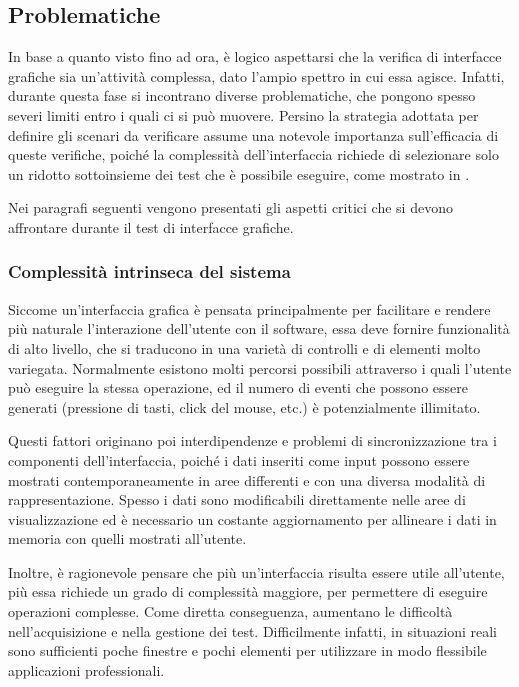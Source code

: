 \subsection{Problematiche}

In base a quanto visto fino ad ora, è logico aspettarsi che la verifica di interfacce grafiche sia un'attività complessa, dato l'ampio spettro in cui essa agisce.
Infatti, durante questa fase si incontrano diverse problematiche, che pongono spesso severi limiti entro i quali ci si può muovere. Persino la strategia adottata per definire gli scenari da verificare assume una notevole importanza sull'efficacia di queste verifiche, poiché la complessità dell'interfaccia richiede di selezionare solo un ridotto sottoinsieme dei test che è possibile eseguire, come mostrato in \cite{guiTestGeneration}.

Nei paragrafi seguenti vengono presentati gli aspetti critici che si devono affrontare durante il test di interfacce grafiche.

\subsubsection{Complessità intrinseca del sistema}
Siccome un'interfaccia grafica è pensata principalmente per facilitare e rendere più naturale l'interazione dell'utente con il software, essa deve fornire funzionalità di alto livello, che si traducono in una varietà di controlli e di elementi molto variegata. Normalmente esistono molti percorsi possibili attraverso i quali l'utente può eseguire la stessa operazione, ed il numero di eventi che possono essere generati (pressione di tasti, click del mouse, etc.) è potenzialmente illimitato.

Questi fattori originano poi interdipendenze e problemi di sincronizzazione tra i componenti dell'interfaccia, poiché i dati inseriti come input possono essere mostrati contemporaneamente in aree differenti e con una diversa modalità di rappresentazione. Spesso i dati sono modificabili direttamente nelle aree di visualizzazione ed è necessario un costante aggiornamento per allineare i dati in memoria con quelli mostrati all'utente.

Inoltre, è ragionevole pensare che più un'interfaccia risulta essere utile all'utente, più essa richiede un grado di complessità maggiore, per permettere di eseguire operazioni complesse. Come diretta conseguenza,  aumentano le difficoltà nell'acquisizione e nella gestione dei test. Difficilmente infatti, in situazioni reali sono sufficienti poche finestre e pochi elementi per utilizzare in modo flessibile applicazioni professionali. 

